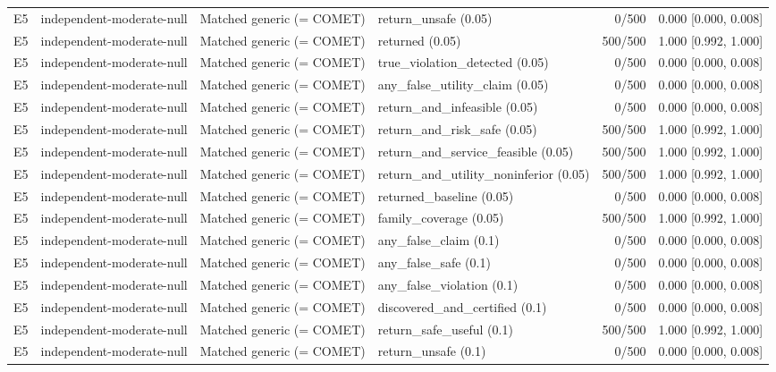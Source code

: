 \begin{longtable}{p{.04\linewidth}p{.18\linewidth}p{.19\linewidth}p{.16\linewidth}r p{.21\linewidth}}
E5 & independent-moderate-null & Matched generic (= COMET) & return\_unsafe (0.05) & 0/500 & 0.000 [0.000, 0.008]\\
E5 & independent-moderate-null & Matched generic (= COMET) & returned (0.05) & 500/500 & 1.000 [0.992, 1.000]\\
E5 & independent-moderate-null & Matched generic (= COMET) & true\_violation\_detected (0.05) & 0/500 & 0.000 [0.000, 0.008]\\
E5 & independent-moderate-null & Matched generic (= COMET) & any\_false\_utility\_claim (0.05) & 0/500 & 0.000 [0.000, 0.008]\\
E5 & independent-moderate-null & Matched generic (= COMET) & return\_and\_infeasible (0.05) & 0/500 & 0.000 [0.000, 0.008]\\
E5 & independent-moderate-null & Matched generic (= COMET) & return\_and\_risk\_safe (0.05) & 500/500 & 1.000 [0.992, 1.000]\\
E5 & independent-moderate-null & Matched generic (= COMET) & return\_and\_service\_feasible (0.05) & 500/500 & 1.000 [0.992, 1.000]\\
E5 & independent-moderate-null & Matched generic (= COMET) & return\_and\_utility\_noninferior (0.05) & 500/500 & 1.000 [0.992, 1.000]\\
E5 & independent-moderate-null & Matched generic (= COMET) & returned\_baseline (0.05) & 0/500 & 0.000 [0.000, 0.008]\\
E5 & independent-moderate-null & Matched generic (= COMET) & family\_coverage (0.05) & 500/500 & 1.000 [0.992, 1.000]\\
E5 & independent-moderate-null & Matched generic (= COMET) & any\_false\_claim (0.1) & 0/500 & 0.000 [0.000, 0.008]\\
E5 & independent-moderate-null & Matched generic (= COMET) & any\_false\_safe (0.1) & 0/500 & 0.000 [0.000, 0.008]\\
E5 & independent-moderate-null & Matched generic (= COMET) & any\_false\_violation (0.1) & 0/500 & 0.000 [0.000, 0.008]\\
E5 & independent-moderate-null & Matched generic (= COMET) & discovered\_and\_certified (0.1) & 0/500 & 0.000 [0.000, 0.008]\\
E5 & independent-moderate-null & Matched generic (= COMET) & return\_safe\_useful (0.1) & 500/500 & 1.000 [0.992, 1.000]\\
E5 & independent-moderate-null & Matched generic (= COMET) & return\_unsafe (0.1) & 0/500 & 0.000 [0.000, 0.008]\\

\end{longtable}

